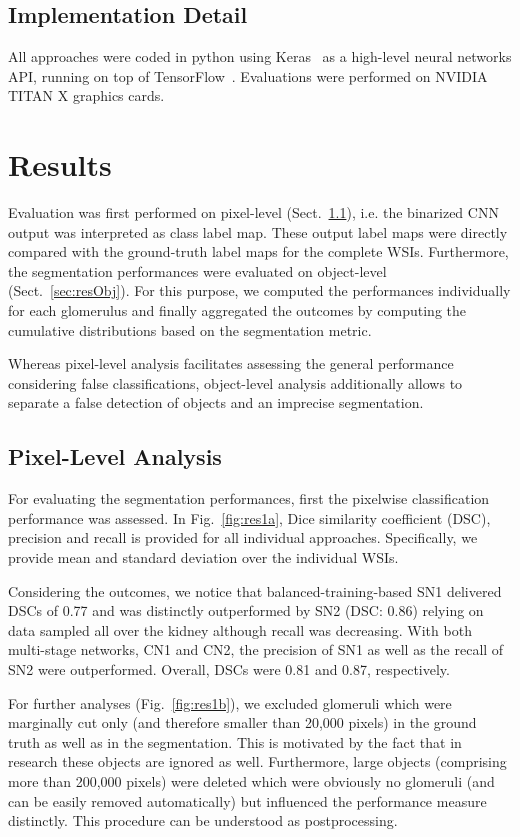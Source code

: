 \documentclass{elsarticle}
\begin{document}
\subsection{Implementation Detail}
All approaches were coded in python using Keras~\citep{keras} as a high-level neural networks API, running on top of TensorFlow~\citep{tensorflow}.
Evaluations were performed on NVIDIA TITAN X graphics cards.


\section{Results}

Evaluation was first performed on pixel-level (Sect.~\ref{sec:resPix}), i.e. the binarized CNN output was interpreted as class label map. These output label maps were directly compared with the ground-truth label maps for the complete WSIs.
%
Furthermore, the segmentation performances were evaluated on object-level (Sect.~\ref{sec:resObj}). For this purpose, we computed the performances individually for each glomerulus and finally aggregated the outcomes by computing the cumulative distributions based on the segmentation metric.

Whereas pixel-level analysis facilitates assessing the general performance considering false classifications, object-level analysis additionally allows to separate a false detection of objects and an imprecise segmentation.

\subsection{Pixel-Level Analysis} \label{sec:resPix}

For evaluating the segmentation performances, first the pixelwise classification performance was assessed. In Fig.~\ref{fig:res1a}, Dice similarity coefficient (DSC), precision and recall is provided for all individual approaches. Specifically, we provide mean and standard deviation over the individual WSIs. 

Considering the outcomes, we notice that balanced-training-based SN1 delivered DSCs of 0.77 and was distinctly outperformed by SN2 (DSC: 0.86) relying on data sampled all over the kidney although recall was decreasing.
With both multi-stage networks, CN1 and CN2, the precision of SN1 as well as the recall of SN2 were outperformed. Overall, DSCs were 0.81 and 0.87, respectively.

For further analyses (Fig.~\ref{fig:res1b}), we excluded glomeruli which were marginally cut only (and therefore smaller than 20,000 pixels) in the ground truth as well as in the segmentation. This is motivated by the fact that in research these objects are ignored as well. Furthermore, large objects (comprising more than 200,000 pixels) were deleted which were obviously no glomeruli (and can be easily removed automatically) but influenced the performance measure distinctly. This procedure can be understood as postprocessing.
\end{document}
